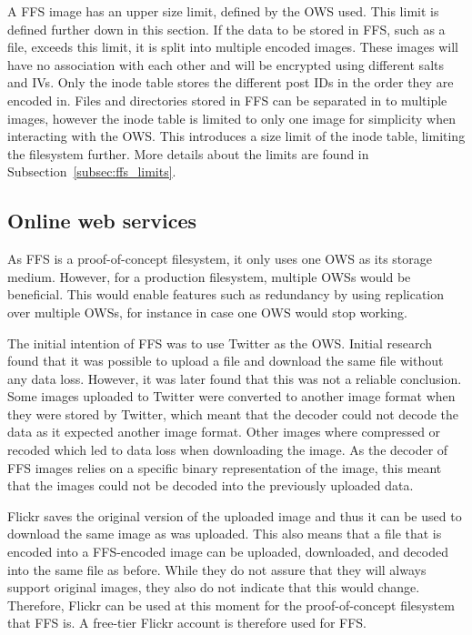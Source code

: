 A FFS image has an upper size limit, defined by the OWS used. This limit is defined further down in this section. If the data to be stored in FFS, such as a file, exceeds this limit, it is split into multiple encoded images. These images will have no association with each other and will be encrypted using different salts and IVs. Only the inode table stores the different post IDs in the order they are encoded in. Files and directories stored in FFS can be separated in to multiple images, however the inode table is limited to only one image for simplicity when interacting with the OWS. This introduces a size limit of the inode table, limiting the filesystem further. More details about the limits are found in Subsection~\ref{subsec:ffs_limits}.

\subsection{Online web services}
As FFS is a proof-of-concept filesystem, it only uses one OWS as its storage medium. However, for a production filesystem, multiple OWSs would be beneficial. This would enable features such as redundancy by using replication over multiple OWSs, for instance in case one OWS would stop working.

The initial intention of FFS was to use Twitter as the OWS. Initial research found that it was possible to upload a file and download the same file without any data loss. However, it was later found that this was not a reliable conclusion. Some images uploaded to Twitter were converted to another image format when they were stored by Twitter, which meant that the decoder could not decode the data as it expected another image format. Other images where compressed or recoded which led to data loss when downloading the image. As the decoder of FFS images relies on a specific binary representation of the image, this meant that the images could not be decoded into the previously uploaded data. 

Flickr saves the original version of the uploaded image and thus it can be used to download the same image as was uploaded. This also means that a file that is encoded into a FFS-encoded image can be uploaded, downloaded, and decoded into the same file as before. While they do not assure that they will always support original images, they also do not indicate that this would change. Therefore, Flickr can be used at this moment for the proof-of-concept filesystem that FFS is. A free-tier Flickr account is therefore used for FFS. 

